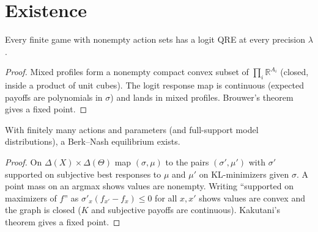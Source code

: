 \section{Existence}
\label{sec:br-existence}

\begin{theorem}
\label{thm:br-qre-exists}
\leanok
{}
Every finite game with nonempty action sets has a logit QRE at every precision $\lambda$.
\end{theorem}
\begin{proof}
\leanok
Mixed profiles form a nonempty compact convex subset of $\prod_i\mathbb{R}^{A_i}$ (closed, inside a product of
unit cubes). The logit response map is continuous (expected payoffs are polynomials in $\sigma$) and lands in mixed
profiles. Brouwer's theorem gives a fixed point.
\end{proof}

\begin{theorem}
\label{thm:br-bn-exists}
\leanok
{}
With finitely many actions and parameters (and full-support model distributions), a Berk--Nash equilibrium exists.
\end{theorem}
\begin{proof}
\leanok
On $\Delta(X)\times\Delta(\Theta)$ map $(\sigma,\mu)$ to the pairs $(\sigma',\mu')$ with $\sigma'$ supported on
subjective best responses to $\mu$ and $\mu'$ on KL-minimizers given $\sigma$. A point mass on an argmax shows values
are nonempty. Writing ``supported on maximizers of $f$'' as $\sigma'_x(f_{x'}-f_x)\le0$ for all $x,x'$ shows values
are convex and the graph is closed ($K$ and subjective payoffs are continuous). Kakutani's theorem gives a fixed point.
\end{proof}
